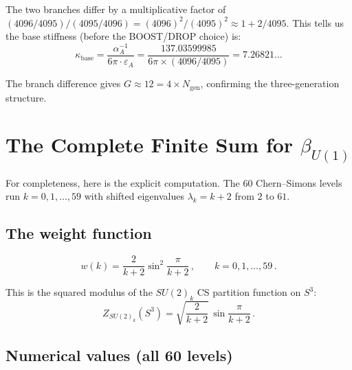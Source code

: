 \documentclass[12pt,a4paper]{article}
\theoremstyle{definition}
\begin{document}
The two branches differ by a multiplicative factor of
$(4096/4095)/(4095/4096) = (4096)^2/(4095)^2 \approx 1 + 2/4095$.
This tells us the base stiffness (before the BOOST/DROP choice) is:
\begin{equation}
\kappa_{\mathrm{base}} = \frac{\alpha^{-1}_A}{6\pi \cdot \varepsilon_A}
= \frac{137.03599985}{6\pi \times (4096/4095)} = 7.26821\ldots
\end{equation}

The branch difference gives $G \approx 12 = 4 \times N_{\mathrm{gen}}$,
confirming the three-generation structure.

\section{The Complete Finite Sum for $\beta_{U(1)}$}
\label{sec:eigenvalues}

For completeness, here is the explicit computation. The 60 Chern--Simons
levels run $k = 0, 1, \ldots, 59$ with shifted eigenvalues
$\lambda_k = k+2$ from $2$ to $61$.

\subsection{The weight function}

\begin{equation}
w(k) = \frac{2}{k+2}\sin^2\!\frac{\pi}{k+2}\,,
\qquad k = 0, 1, \ldots, 59\,.
\end{equation}

This is the squared modulus of the $SU(2)_k$ CS partition function on $S^3$:
\begin{equation}
Z_{SU(2)_k}(S^3) = \sqrt{\frac{2}{k+2}}\,\sin\!\frac{\pi}{k+2}\,.
\end{equation}

\subsection{Numerical values (all 60 levels)}
\end{document}
